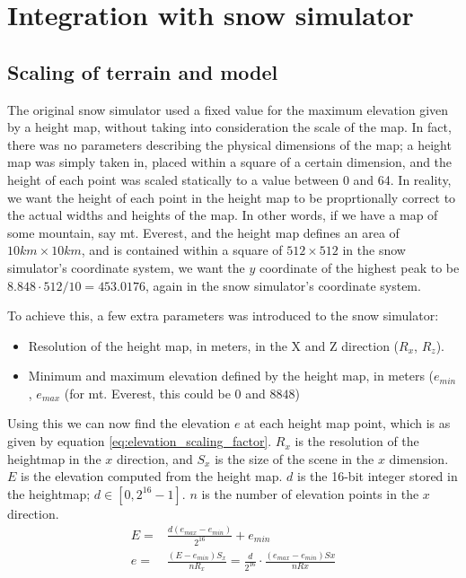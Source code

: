 \section{Integration with snow simulator}
\label{sec:impl_snowsim}

\subsection{Scaling of terrain and model}
The original snow simulator used a fixed value for the maximum elevation given by a height map, without taking into consideration the scale of the map. In fact, there was no parameters describing the physical dimensions of the map; a height map was simply taken in, placed within a square of a certain dimension, and the height of each point was scaled statically to a value between 0 and 64. In reality, we want the height of each point in the height map to be proprtionally correct to the actual widths and heights of the map. In other words, if we have a map of some mountain, say mt. Everest, and the height map defines an area of $10km\times 10km$, and is contained within a square of $512\times 512$ in the snow simulator's coordinate system, we want the $y$ coordinate of the highest peak to be $8.848\cdot 512/10 = 453.0176$, again in the snow simulator's coordinate system.

To achieve this, a few extra parameters was introduced to the snow simulator:
\begin{itemize}
\item Resolution of the height map, in meters, in the X and Z direction ($R_x$, $R_z$).
\item Minimum and maximum elevation defined by the height map, in meters ($e_{min}$, $e_{max}$ (for mt. Everest, this could be $0$ and $8848$)
\end{itemize}
Using this we can now find the elevation $e$ at each height map point, which is as given by equation \ref{eq:elevation_scaling_factor}. $R_x$ is the resolution of the heightmap in the $x$ direction, and $S_x$ is the size of the scene in the $x$ dimension. $E$ is the elevation computed from the height map. $d$ is the 16-bit integer stored in the heightmap; $d\in [0,2^{16}-1]$. $n$ is the number of elevation points in the $x$ direction.
\begin{align}
E =& \frac{d(e_{max}-e_{min})}{2^{16}}+e_{min}\\
e =& \frac{(E-e_{min})S_x}{nR_x} = \frac{d}{2^{16}}\cdot \frac{(e_{max}-e_{min})Sx}{nRx} \label{eq:elevation_scaling_factor}
\end{align}

